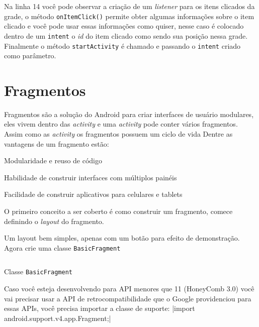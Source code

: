 \documentclass[a4paper,12pt,brazil,doubleside]{book}
\begin{document}
\begin{singlespace}
Na linha 14 você pode observar a criação de um \emph{listener} para os itens clicados da grade, o método \texttt{onItemClick()} permite obter algumas informações sobre o item clicado e você pode usar essas informações como quiser, nesse caso é colocado dentro de um \texttt{intent} o \emph{id} do item clicado como sendo sua posição nessa grade. Finalmente o método \texttt{startActivity} é chamado e passando o \texttt{intent} criado como parâmetro.   

\section{Fragmentos}

Fragmentos são a solução do Android para criar interfaces de usuário modulares, eles vivem dentro das \emph{activity} e uma \emph{activity} pode conter vários fragmentos. Assim como as \emph{activity} os fragmentos possuem um ciclo de vida %
Dentre as vantagens de um fragmento estão:
\bi
	\item Modularidade e reuso de código
	\item Habilidade de construir interfaces com múltiplos painéis
	\item Facilidade de construir aplicativos para celulares e tablets
\ei

O primeiro conceito a ser coberto é como construir um fragmento, comece definindo o \emph{layout} do fragmento.

Um layout bem simples, apenas com um botão para efeito de demonstração. Agora crie uma classe \texttt{BasicFragment}

\begin{listing}[H]
\inputminted[linenos=true,fontsize=\small,frame=lines, framesep=2mm, tabsize=2,numbersep=5pt]{java}{src/design/basicfragment.java}
\caption{Classe \texttt{BasicFragment}}
\end{listing}	

Caso você esteja desenvolvendo para API menores que 11 (HoneyComb 3.0) você vai precisar usar a API de retrocompatibilidade que o Google providenciou para essas APIs, você precisa importar a classe de suporte: |import android.support.v4.app.Fragment;|



\end{singlespace}
\end{document}
